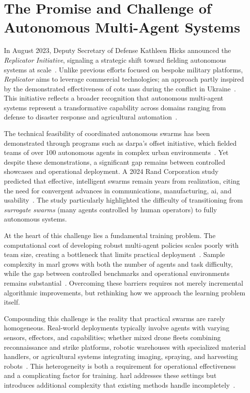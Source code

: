 \section{The Promise and Challenge of Autonomous Multi-Agent Systems}%
\label{sec:intro_motivation}

In August 2023, Deputy Secretary of Defense Kathleen Hicks announced the 
\emph{Replicator Initiative}, signaling a strategic shift toward fielding 
autonomous systems at scale~\cites{robertson2023,zotero-2656}. 
Unlike previous efforts focused on bespoke military platforms, 
\emph{Replicator} aims to leverage commercial technologies; 
an approach partly inspired by the demonstrated effectiveness of 
\gls{cots} \glspl{uas} during the conflict in Ukraine~\cite{bajak2023a}. 
This initiative reflects a broader recognition that autonomous multi-agent 
systems represent a transformative capability across domains ranging from 
defense to disaster response and agricultural 
automation~\cite{mohddaud2022,hambling2021,rogers2022}.

The technical feasibility of coordinated autonomous swarms has been 
demonstrated through programs such as \gls{darpa}'s \gls{offset} initiative, 
which fielded teams of over 100 autonomous agents in complex urban 
environments~\cite{zotero-2835}. Yet despite these demonstrations, 
a significant gap remains between controlled showcases and operational deployment. 
A 2024 Rand Corporation study predicted that effective, intelligent 
swarms remain years from realization, citing the need for convergent 
advances in communications, manufacturing, \gls{ai}, and usability~\cite{gerstein2024}. 
The study particularly highlighted the difficulty of transitioning from 
\emph{surrogate swarms} (many agents controlled by human operators) 
to fully autonomous systems.

At the heart of this challenge lies a fundamental training problem. 
The computational cost of developing robust multi-agent policies 
scales poorly with team size, creating a bottleneck that limits 
practical deployment~\cite{jin2025,canese2021}. 
Sample complexity in \gls{marl} grows with both the number of 
agents and task difficulty, while the gap between controlled 
benchmarks and operational environments remains 
substantial~\cite{gronauer2022,krouka2022}. Overcoming these 
barriers requires not merely incremental algorithmic improvements, 
but rethinking how we approach the learning problem itself.

Compounding this challenge is the reality that practical swarms 
are rarely homogeneous. Real-world deployments typically involve 
agents with varying sensors, effectors, and capabilities; 
whether mixed drone fleets combining reconnaissance and strike platforms, 
robotic warehouses with specialized material handlers, 
or agricultural systems integrating imaging, spraying, 
and harvesting robots~\cite{rizk2019,hoang2023,amarasinghe2019,carbone2018}. 
This heterogeneity is both a requirement for operational effectiveness 
and a complicating factor for training. \Gls{harl} addresses these 
settings but introduces additional complexity that existing methods 
handle incompletely~\cite{calvo2018,zhong2024}.

